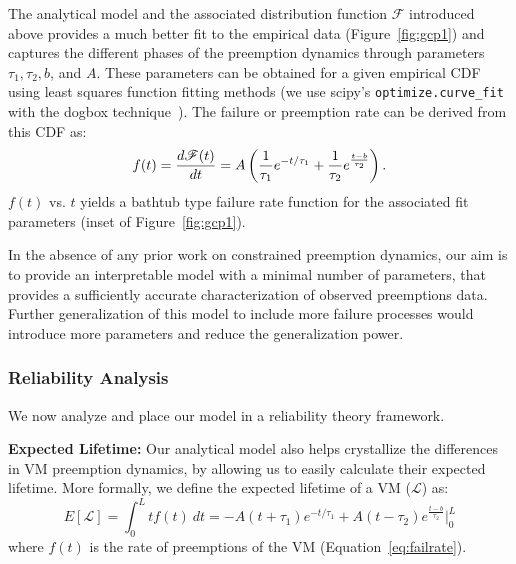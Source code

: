 The analytical model and the associated  distribution function $\mathscr{F}$ introduced above provides a much better fit to the empirical data (Figure~\ref{fig:gcp1}) and captures the different phases of the preemption dynamics through parameters $\tau_1, \tau_2, b$, and $A$. These parameters can be obtained for a given empirical CDF using least squares function fitting methods (we use scipy's \texttt{optimize.curve\_fit} with the dogbox technique~\cite{scipy-fit}). The failure or preemption rate can be derived from this CDF as:
\begin{equation}
  \label{eq:failrate}
    \vspace*{\eqnspace}
f(t) = \dfrac{d \mathscr{F}(t)} {dt} = A \left(\dfrac{1}{\tau_1}e^{-t/\tau_1} + \dfrac{1}{\tau_2}e^{\frac{t-b}{\tau_2}}\right).
\end{equation}
$f(t)$ vs. $t$ yields a bathtub type failure rate function for the associated fit parameters (inset of Figure~\ref{fig:gcp1}).


In the absence of any prior work on constrained preemption dynamics, our aim is to provide an interpretable model with a minimal number of parameters, that provides a sufficiently accurate characterization of observed preemptions data. 
Further generalization of this model to include more failure processes would introduce more parameters and reduce the generalization power. 


\subsubsection{Reliability Analysis}
\label{subsec:reliability}

We now analyze and place our model in a reliability theory framework. 
%

\noindent \textbf{Expected Lifetime:} Our analytical model also helps crystallize the differences in VM preemption dynamics, by allowing us to easily calculate their expected lifetime. 
More formally, we define the expected lifetime of a VM ($\mathscr{L}$) as: 
\begin{equation}
  \label{eq:expected-lifetime}
E[\mathscr{L}] =  \int_{0}^{L} t {f}(t)~dt =  -A(t+\tau_1)e^{-t/\tau_1} + A(t-\tau_2) e^{\frac{t-b}{\tau_2}} \biggr\rvert_{0}^{L}
\end{equation}
where $f(t)$ is the rate of preemptions of the VM (Equation~\ref{eq:failrate}).
%

